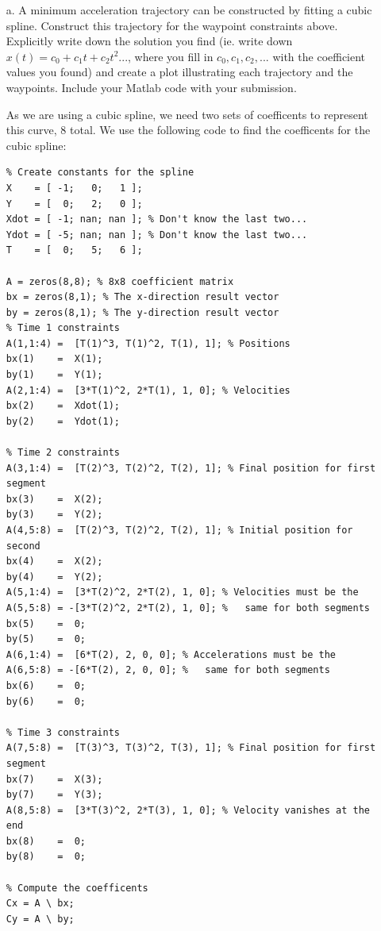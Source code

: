 \documentclass[english]{article}
\begin{document}
\begin{enumerate}
 \item[a.] A minimum acceleration trajectory can be constructed by fitting a cubic spline. Construct this trajectory for the waypoint constraints above. Explicitly write down the solution you find (ie. write down $x(t) = c_0 + c_1 t + c_2 t^2 ...$, where you fill in $c_0, c_1, c_2, ...$ with the coefficient values you found) and create a plot illustrating each trajectory and the waypoints. Include your Matlab code with your submission. 

As we are using a cubic spline, we need two sets of coefficents to represent this curve, 8 total.
We use the following code to find the coefficents for the cubic spline: 
\begin{lstlisting}
% Create constants for the spline
X    = [ -1;   0;   1 ];
Y    = [  0;   2;   0 ];
Xdot = [ -1; nan; nan ]; % Don't know the last two...
Ydot = [ -5; nan; nan ]; % Don't know the last two...
T    = [  0;   5;   6 ];

A = zeros(8,8); % 8x8 coefficient matrix
bx = zeros(8,1); % The x-direction result vector
by = zeros(8,1); % The y-direction result vector
% Time 1 constraints
A(1,1:4) =  [T(1)^3, T(1)^2, T(1), 1]; % Positions
bx(1)    =  X(1);
by(1)    =  Y(1);
A(2,1:4) =  [3*T(1)^2, 2*T(1), 1, 0]; % Velocities
bx(2)    =  Xdot(1);
by(2)    =  Ydot(1);

% Time 2 constraints
A(3,1:4) =  [T(2)^3, T(2)^2, T(2), 1]; % Final position for first segment
bx(3)    =  X(2);
by(3)    =  Y(2);
A(4,5:8) =  [T(2)^3, T(2)^2, T(2), 1]; % Initial position for second
bx(4)    =  X(2);
by(4)    =  Y(2);
A(5,1:4) =  [3*T(2)^2, 2*T(2), 1, 0]; % Velocities must be the
A(5,5:8) = -[3*T(2)^2, 2*T(2), 1, 0]; %   same for both segments
bx(5)    =  0;
by(5)    =  0;
A(6,1:4) =  [6*T(2), 2, 0, 0]; % Accelerations must be the
A(6,5:8) = -[6*T(2), 2, 0, 0]; %   same for both segments
bx(6)    =  0;
by(6)    =  0;

% Time 3 constraints
A(7,5:8) =  [T(3)^3, T(3)^2, T(3), 1]; % Final position for first segment
bx(7)    =  X(3);
by(7)    =  Y(3);
A(8,5:8) =  [3*T(3)^2, 2*T(3), 1, 0]; % Velocity vanishes at the end
bx(8)    =  0;
by(8)    =  0;

% Compute the coefficents
Cx = A \ bx;
Cy = A \ by;

\end{lstlisting}


\end{enumerate}
\end{document}

